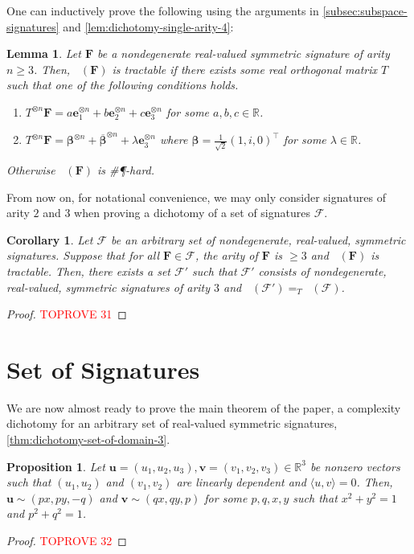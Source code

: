 \documentclass[11pt]{article}
\newtheorem{lemma}[theorem]{Lemma}
\newtheorem{corollary}[theorem]{Corollary}
\newtheorem{proposition}[theorem]{Proposition}
\DeclareMathOperator{\holts}{Holant^*_3}
\newcommand{\sph}{\#\P-hard\xspace}
\newcommand{\transpose}{^\intercal}
\begin{document}
One can inductively prove the following using the arguments in \cref{subsec:subspace-signatures} and \cref{lem:dichotomy-single-arity-4}:
\begin{lemma}\label{lem:dichotomy-single-arity-n}
Let $\mathbf{F}$ be a nondegenerate real-valued symmetric signature of arity $n \ge 3$.
Then, $\holts(\mathbf{F})$ is tractable if there exists some real orthogonal matrix $T$ such that one of the following conditions holds.
\begin{enumerate}
  \item $T^{\otimes n} \mathbf{F} = a \mathbf{e}_1^{\otimes n} + b \mathbf{e}_2^{\otimes n} + c \mathbf{e}_3^{\otimes n}$ for some $a, b, c \in \mathbb{R}$.
  \item $T^{\otimes n}\mathbf{F} = \boldsymbol{\beta}^{\otimes n} + \overline{\boldsymbol{\beta}}^{\otimes n} + \lambda \mathbf{e}_3^{\otimes n}$ where $\mathbf{\beta} = \frac{1}{\sqrt{2}}(1, i, 0)\transpose$ for some $\lambda \in \mathbb{R}$.
\end{enumerate}
Otherwise $\holts(\mathbf{F})$ is \sph.
\end{lemma}
From now on, for notational convenience, we may only consider signatures of arity $2$ and $3$ when proving a dichotomy of a set of signatures $\mathcal{F}$. 
\begin{corollary}\label{cor:replace-arity-3}
    Let $\mathcal{F}$ be an arbitrary set of nondegenerate, real-valued, symmetric signatures.
    Suppose that for all $\mathbf{F} \in \mathcal{F}$, the arity of $\mathbf{F}$ is $\ge 3$ and $\holts(\mathbf{F})$ is tractable.
    Then, there exists a set $\mathcal{F}'$ such that $\mathcal{F}'$ consists of nondegenerate, real-valued, symmetric signatures of arity $3$ and 
    $\holts(\mathcal{F}') =_T \holts(\mathcal{F})$.
\end{corollary}
\begin{proof}\textcolor{red}{TOPROVE 31}\end{proof} 
\section{Set of Signatures}\label{sec:set-of-signatures}
We are now almost ready to prove the main theorem of the paper, a complexity dichotomy 
for an arbitrary set of real-valued symmetric signatures, \cref{thm:dichotomy-set-of-domain-3}.

\begin{proposition}\label{prop:normalize-lin-dep-orthogonal-vectors}
  Let
  $\mathbf{u} = (u_1, u_2, u_3), \mathbf{v} = (v_1, v_2, v_3) \in \mathbb{R}^3$ be nonzero vectors such that $(u_1, u_2)$ and $(v_1, v_2)$ are linearly dependent and $\langle u, v \rangle = 0$.
  Then, $\mathbf{u} \sim (px, py, -q)$ and $\mathbf{v} \sim (qx, qy, p)$ for some $p, q, x, y$ such that $x^2 + y^2 = 1$ and $p^2 + q^2 = 1$.
\end{proposition}
\begin{proof}\textcolor{red}{TOPROVE 32}\end{proof}
\end{document}
